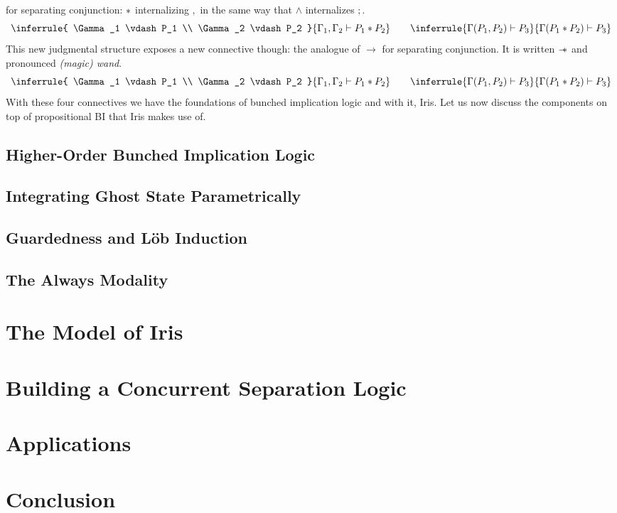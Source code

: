 \documentclass{amsart}
\newcommand{\limplies}{\to}
\begin{document}
for separating conjunction: $\ast$ internalizing $,$ in the same way
that $\land$ internalizes $;$.
\[
  \inferrule{
    \Gamma_1 \vdash P_1 \\ \Gamma_2 \vdash P_2
  }{\Gamma_1, \Gamma_2 \vdash P_1 \sep P_2}\qquad
  \inferrule{
    \Gamma(P_1, P_2) \vdash P_3
  }{\Gamma(P_1 \sep P_2) \vdash P_3}
\]
This new judgmental structure exposes a new connective though: the
analogue of $\limplies$ for separating conjunction. It is written
$\mathrel{-\!\!*}$ and pronounced \emph{(magic) wand}.
\[
  \inferrule{
    \Gamma_1 \vdash P_1 \\ \Gamma_2 \vdash P_2
  }{\Gamma_1, \Gamma_2 \vdash P_1 \sep P_2}\qquad
  \inferrule{
    \Gamma(P_1, P_2) \vdash P_3
  }{\Gamma(P_1 \sep P_2) \vdash P_3}
\]
With these four connectives we have the foundations of bunched
implication logic and with it, Iris. Let us now discuss the components
on top of propositional BI that Iris makes use of.

\subsection{Higher-Order Bunched Implication Logic}

\subsection{Integrating Ghost State Parametrically}

\subsection{Guardedness and L\"ob Induction}

\subsection{The Always Modality}

\section{The Model of Iris}

\section{Building a Concurrent Separation Logic}

\section{Applications}

\section{Conclusion}



{}
\end{document}
